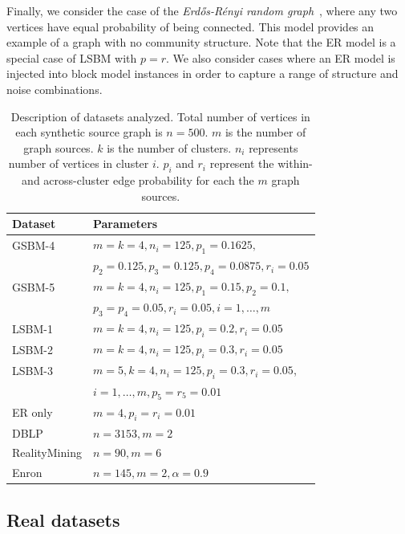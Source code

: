 \documentclass{IEEEtran}
\newcommand{\er}{Erd\H{o}s-R\'{e}nyi }
\begin{document}
Finally, we consider the case of the \emph{\er random graph}~\cite{Erdos60},
where any two vertices have equal probability of being connected. This model
provides an example of a graph with no community structure. Note that the ER
model is a special case of LSBM with $p=r$. We also consider cases where an ER
model is injected into block model instances in order to capture a range of
structure and noise combinations.

\begin{table}
\begin{tabular}{| l | l |}
\hline
Dataset & Parameters\\
\hline \hline
GSBM-4 & $m =k= 4, n_i=125, p_1=0.1625, $ \\ 
       & $p_2 = 0.125, p_3 = 0.125, p_4 = 0.0875, r_i = 0.05$ \\
       
GSBM-5 & $m=k=4, n_i=125, p_1=0.15, p_2=0.1,$ \\ 
       & $p_3=p_4=0.05, r_i = 0.05, i=1, \ldots, m$ \\

\hline
LSBM-1 & $m=k=4, n_i=125, p_i=0.2, r_i=0.05$ \\
LSBM-2 & $m=k=4, n_i=125, p_i=0.3, r_i=0.05$ \\
LSBM-3 & $m=5,k=4, n_i=125, p_i=0.3, r_i=0.05$, \\ 
       & $i = 1, \dots, m, p_5= r_5 = 0.01$ \\
\hline
ER only &  $m=4, p_i=r_i=0.01$ \\
DBLP    & $n = 3153, m = 2$ \\
RealityMining      & $n = 90, m = 6$ \\
Enron   & $n = 145, m = 2, \alpha=0.9$ \\
\hline
\end{tabular}
\caption{Description of datasets analyzed. Total number of vertices in each
synthetic source graph is $n=500$.  $m$ is the number of graph sources. $k$ is
the number of clusters. $n_i$ represents number of vertices in cluster $i$.
$p_i$ and $r_i$ represent the within- and across-cluster edge probability for
each the $m$ graph sources.}
\label{datasets}
\end{table}


\subsection{Real datasets} 
\end{document}

